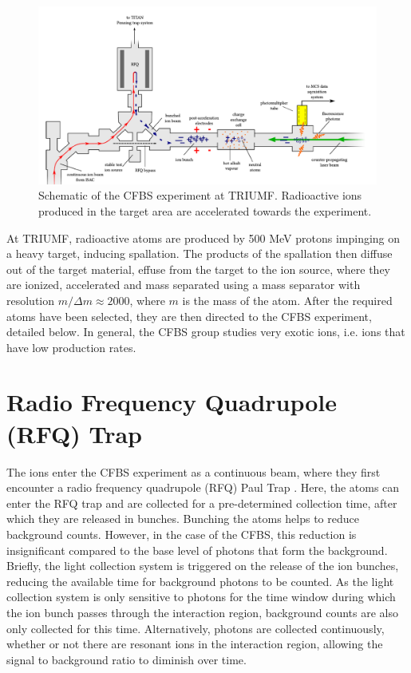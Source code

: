\begin{figure}[h]
\includegraphics[width=\textwidth]{Laser_spec_triumf/experiment.png}
\caption[Schematic of the CFBS experiment at TRIUMF]{\small Schematic of the CFBS experiment at TRIUMF.\cite{CFBS} Radioactive ions produced in the target area are accelerated towards the experiment.}
\label{exp}
\end{figure}

At TRIUMF, radioactive atoms are produced by 500 MeV protons impinging on a heavy target, inducing spallation. The products of the spallation then diffuse out of the target material, effuse from the target to the ion source, where they are ionized, accelerated and mass separated using a mass separator with resolution $m/\Delta m \approx 2000$, where $m$ is the mass of the atom. \cite{CFBS} After the required atoms have been selected, they are then directed to the CFBS experiment, detailed below. In general, the CFBS group studies very exotic ions, i.e. ions that have low production rates.

\section{Radio Frequency Quadrupole (RFQ) Trap}

The ions enter the CFBS experiment as a continuous beam, where they first encounter a radio frequency quadrupole (RFQ) Paul Trap \cite{CFBS}. Here, the atoms can enter the RFQ trap and are collected for a pre-determined collection time, after which they are released in bunches. Bunching the atoms helps to reduce background counts. However, in the case of the CFBS, this reduction is insignificant compared to the base level of photons that form the background. Briefly, the light collection system is triggered on the release of the ion bunches, reducing the available time for background photons to be counted. As the light collection system is only sensitive to photons for the time window during which the ion bunch passes through the interaction region, background counts are also only collected for this time. Alternatively, photons are collected continuously, whether or not there are resonant ions in the interaction region, allowing the signal to background ratio to diminish over time. 

